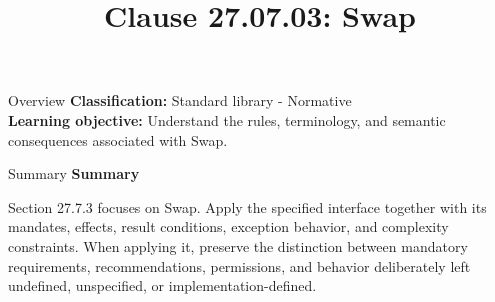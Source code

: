\documentclass[10pt,letterpaper]{article}
\title{Clause 27.07.03: Swap}
\author{}
\date{}
\begin{document}
\maketitle
\begin{CornellOverviewBox}{Overview}
\textbf{Classification:} Standard library - Normative\\[2pt]
\textbf{Learning objective:} Understand the rules, terminology, and semantic consequences associated with Swap.
\end{CornellOverviewBox}\begin{CornellSummaryBox}{Summary}
{\sffamily\bfseries\color{Accent} Summary}\par\vspace{3pt}Section 27.7.3 focuses on Swap. Apply the specified interface together with its mandates, effects, result conditions, exception behavior, and complexity constraints. When applying it, preserve the distinction between mandatory requirements, recommendations, permissions, and behavior deliberately left undefined, unspecified, or implementation-defined.
\end{CornellSummaryBox}
\end{document}
